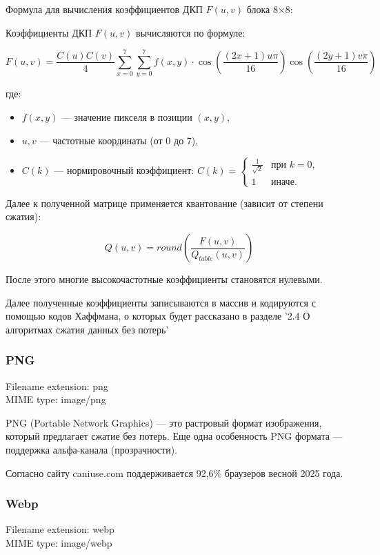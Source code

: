 \documentclass[12pt]{article}
\begin{document}
Формула для вычисления коэффициентов ДКП $F(u,v)$ блока 8×8:

Коэффициенты ДКП $F(u,v)$ вычисляются по формуле:

\[
    F(u,v) = \frac{C(u)C(v)}{4} \sum_{x=0}^{7} \sum_{y=0}^{7} f(x,y) \cdot \cos\left(\frac{(2x+1)u\pi}{16}\right) \cos\left(\frac{(2y+1)v\pi}{16}\right)
\]

где:
\begin{itemize}
    \item $f(x,y)$ — значение пикселя в позиции $(x,y)$,
    \item $u,v$ — частотные координаты (от 0 до 7),
    \item $C(k)$ — нормировочный коэффициент:
          $
              C(k) = \begin{cases}
                  \frac{1}{\sqrt{2}} & \text{при } k=0, \\
                  1                  & \text{иначе}.
              \end{cases}
          $
\end{itemize}

Далее к полученной матрице применяется квантование (зависит от степени сжатия):

\[
    Q(u, v) = round(\frac{F(u, v)}{Q_{table}(u, v)})
\]

После этого многие высокочастотные коэффициенты становятся нулевыми.

Далее полученные коэффициенты записываются в массив и кодируются с помощью кодов Хаффмана, о которых
будет рассказано в разделе '2.4 О алгоритмах сжатия данных без потерь'

\subsubsection{PNG}

Filename extension: png\\
MIME type: image/png

PNG (Portable Network Graphics) — это растровый формат изображения, который предлагает сжатие
без потерь. Еще одна особенность PNG формата — поддержка альфа-канала (прозрачности).

Согласно сайту caniuse.com поддерживается 92,6\% браузеров весной 2025 года.

\subsubsection{Webp}
Filename extension: webp\\
MIME type: image/webp
\end{document}
